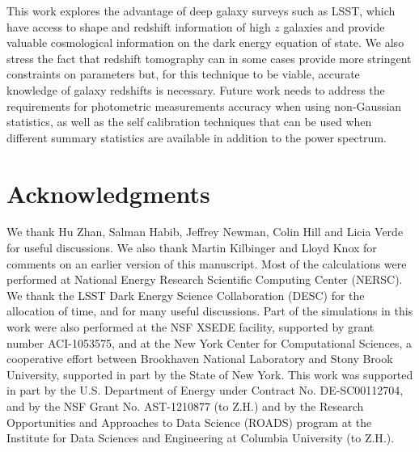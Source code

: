 \documentclass[reprint,aps,prd,superscriptaddress,showkeys,showpacs]{revtex4-1}
\begin{document}
This work explores the advantage of deep galaxy surveys such as LSST, which have access to shape and redshift information of high $z$ galaxies and provide valuable cosmological information on the dark energy equation of state. We also stress the fact that redshift tomography can in some cases provide more stringent constraints on parameters but, for this technique to be viable, accurate knowledge of galaxy redshifts is necessary. Future work needs to address the requirements for photometric measurements accuracy when using non-Gaussian statistics, as well as the self calibration techniques that can be used when different summary statistics are available in addition to the power spectrum. 


\section*{Acknowledgments}

We thank Hu Zhan, Salman Habib, Jeffrey Newman, Colin Hill and Licia Verde for useful discussions. We also thank Martin Kilbinger and Lloyd Knox for comments on an earlier version of this manuscript. Most of the calculations were performed at National Energy Research Scientific Computing Center (NERSC). We thank the LSST Dark Energy Science Collaboration (DESC) for the allocation of time, and for many useful discussions. 
Part of the simulations in this work were also performed at the NSF XSEDE facility, supported by grant number
ACI-1053575, and at the New York Center for Computational Sciences, a
cooperative effort between Brookhaven National Laboratory and Stony
Brook University, supported in part by the State of New York. This
work was supported in part by the U.S. Department of Energy under
Contract No. DE-SC00112704, and by the NSF Grant
No. AST-1210877 (to Z.H.) and by the Research Opportunities and
Approaches to Data Science (ROADS) program at the Institute for Data
Sciences and Engineering at Columbia University (to Z.H.).




\label{lastpage}
\end{document}
